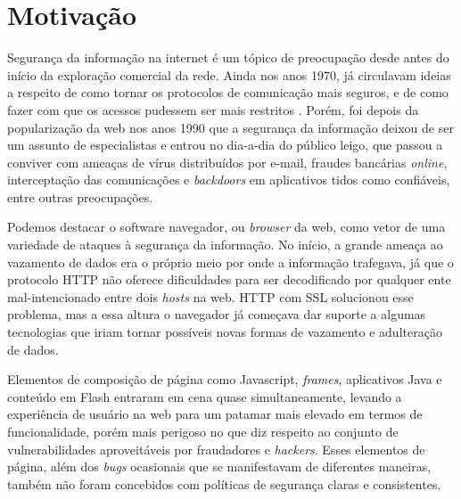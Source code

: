 \section{Motivação}


Segurança da informação na internet é um tópico de preocupação desde antes do início da exploração comercial da rede. Ainda nos anos 1970, já circulavam ideias a respeito de como tornar os protocolos de comunicação mais seguros, e de como fazer com que os acessos pudessem ser mais restritos \cite{WSP2015}. Porém, foi depois da popularização da web nos anos 1990 que a segurança da informação deixou de ser um assunto de especialistas e entrou no dia-a-dia do público leigo, que passou a conviver com ameaças de vírus distribuídos por e-mail, fraudes bancárias \textit{online}, interceptação das comunicações e \textit{backdoors} em aplicativos tidos como confiáveis, entre outras preocupações.

Podemos destacar o software navegador, ou \textit{browser} da web, como vetor de uma variedade de ataques à segurança da informação. No início, a grande ameaça ao vazamento de dados era o próprio meio por onde a informação trafegava, já que o protocolo HTTP não oferece dificuldades para ser decodificado por qualquer ente mal-intencionado entre dois \textit{hosts} na web. HTTP com SSL solucionou esse problema, mas a essa altura o navegador já começava dar suporte a algumas tecnologias que iriam tornar possíveis novas formas de vazamento e adulteração de dados.

Elementos de composição de página como Javascript, \textit{frames}, aplicativos Java e conteúdo em Flash entraram em cena quase simultaneamente, levando a experiência de usuário na web para um patamar mais elevado em termos de funcionalidade, porém mais perigoso no que diz respeito ao conjunto de vulnerabilidades aproveitáveis por fraudadores e \textit{hackers}. Esses elementos de página, além dos \textit{bugs} ocasionais que se manifestavam de diferentes maneiras, também não foram concebidos com políticas de segurança claras e consistentes.

